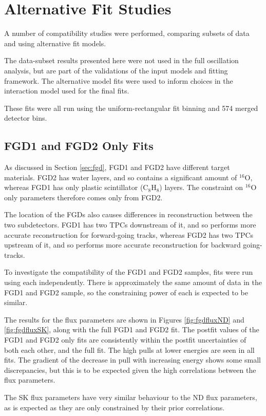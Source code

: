 \chapter{Alternative Fit Studies}

A number of compatibility studies were performed, comparing subsets of data and using alternative fit models.

The data-subset results presented here were not used in the full oscillation analysis, but are part of the validations of the input models and fitting framework. The alternative model fits were used to inform choices in the interaction model used for the final fits.

These fits were all run using the uniform-rectangular fit binning and 574 merged detector bins.

\section{FGD1 and FGD2 Only Fits}

As discussed in Section \ref{sec:fgd}, FGD1 and FGD2 have different target materials. FGD2 has water layers, and so contains a significant amount of $^{16}$O, whereas FGD1 has only plastic scintillator (C$_8$H$_8$) layers. The constraint on $^{16}$O only parameters therefore comes only from FGD2. 

The location of the FGDs also causes differences in reconstruction between the two subdetectors. FGD1 has two TPCs downstream of it, and so performs more accurate reconstruction for forward-going tracks, whereas FGD2 has two TPCs upstream of it, and so performs more accurate reconstruction for backward going-tracks.

To investigate the compatibility of the FGD1 and FGD2 samples, fits were run using each independently. There is approximately the same amount of data in the FGD1 and FGD2 sample, so the constraining power of each is expected to be similar.

The results for the flux parameters are shown in Figures \ref{fig:fgdfluxND} and \ref{fig:fgdfluxSK}, along with the full FGD1 and FGD2 fit. The postfit values of the FGD1 and FGD2 only fits are consistently within the postfit uncertainties of both each other, and the full fit. The high pulls at lower energies are seen in all fits. The gradient of the decrease in pull with increasing energy shows some small discrepancies, but this is to be expected given the high correlations between the flux parameters.

The SK flux parameters have very similar behaviour to the ND flux parameters, as is expected as they are only constrained by their prior correlations.

